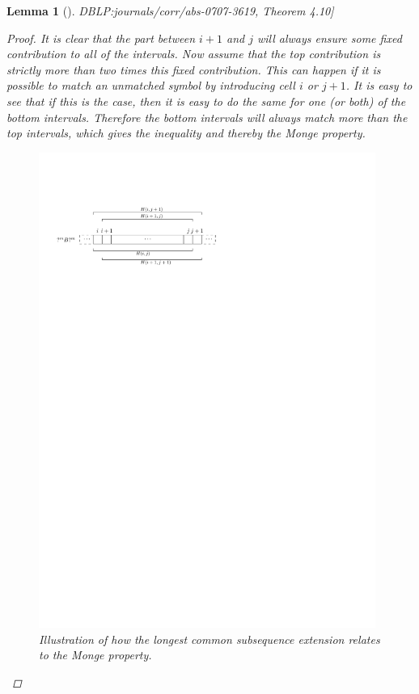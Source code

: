 \documentclass[twoside,11pt,openright]{report}
\newcommand{\refbook}[2]{\cite[#1]{DBLP:journals/corr/abs-0707-3619}, #2}
\newtheorem{lemma}{Lemma}
\begin{document}
\begin{lemma}[\refbook{p.-49}{Theorem 4.10}]
\begin{proof}
    It is clear that the part between $i + 1$ and $j$ will always ensure some fixed contribution to all of the intervals. Now assume that the top contribution is strictly more than two times this fixed contribution. This can happen if it is possible to match an unmatched symbol by introducing cell $i$ or $j + 1$. It is easy to see that if this is the case, then it is easy to do the same for one (or both) of the bottom intervals. Therefore the bottom intervals will always match more than the top intervals, which gives the inequality and thereby the Monge property.
    \begin{figure}[h!]
      \centering
      \includegraphics[width=11cm]{images/monge-condition-illustration}
      \caption{Illustration of how the longest common subsequence extension relates to the Monge property.}
      \label{fig:H-permutation-representation:monge}
    \end{figure}


\end{proof}
\end{lemma}
\end{document}
